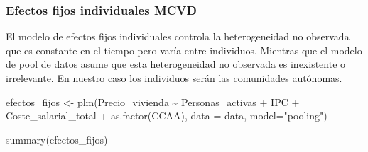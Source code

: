 \documentclass[
]{article}
\newenvironment{Shaded}{\begin{snugshade}}{\end{snugshade}}
\newcommand{\AttributeTok}[1]{\textcolor[rgb]{0.77,0.63,0.00}{#1}}
\newcommand{\FunctionTok}[1]{\textcolor[rgb]{0.00,0.00,0.00}{#1}}
\newcommand{\NormalTok}[1]{#1}
\newcommand{\OtherTok}[1]{\textcolor[rgb]{0.56,0.35,0.01}{#1}}
\newcommand{\SpecialCharTok}[1]{\textcolor[rgb]{0.00,0.00,0.00}{#1}}
\newcommand{\StringTok}[1]{\textcolor[rgb]{0.31,0.60,0.02}{#1}}
\begin{document}
\hypertarget{efectos-fijos-individuales-mcvd}{%
\subsubsection{Efectos fijos individuales
MCVD}\label{efectos-fijos-individuales-mcvd}}

El modelo de efectos fijos individuales controla la heterogeneidad no
observada que es constante en el tiempo pero varía entre individuos.
Mientras que el modelo de pool de datos asume que esta heterogeneidad no
observada es inexistente o irrelevante. En nuestro caso los individuos
serán las comunidades autónomas.

\begin{Shaded}
\begin{Highlighting}[]
\NormalTok{efectos\_fijos }\OtherTok{\textless{}{-}} \FunctionTok{plm}\NormalTok{(Precio\_vivienda }\SpecialCharTok{\textasciitilde{}}\NormalTok{ Personas\_activas }\SpecialCharTok{+}\NormalTok{ IPC }\SpecialCharTok{+}\NormalTok{ Coste\_salarial\_total }\SpecialCharTok{+} \FunctionTok{as.factor}\NormalTok{(CCAA), }\AttributeTok{data =}\NormalTok{ data, }\AttributeTok{model=}\StringTok{"pooling"}\NormalTok{)}

\FunctionTok{summary}\NormalTok{(efectos\_fijos)}
\end{Highlighting}
\end{Shaded}
\end{document}
